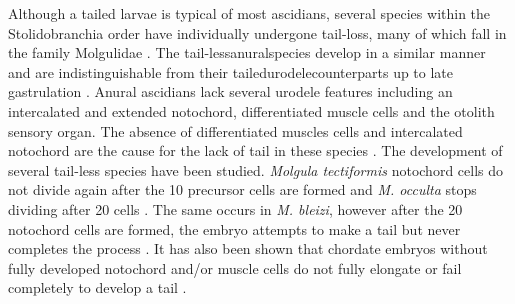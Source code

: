 Although a tailed larvae is typical of most ascidians, several species within the Stolidobranchia order have individually undergone tail-loss, many of which fall in the family Molgulidae \cite{berrill_studies_1931, jeffery_evolution_1999, huber_evolution_2000, maliska_molgula_2010}. The tail-less\textemdash anural\textemdash species develop in a similar manner and are indistinguishable from their tailed\textemdash urodele\textemdash counterparts up to late gastrulation \cite{berrill_studies_1931, swalla_interspecific_1990, jeffery_factors_1992}. Anural ascidians lack several urodele features including an intercalated and extended notochord, differentiated muscle cells and the otolith sensory organ. The absence of differentiated muscles cells and intercalated notochord are the cause for the lack of tail in these species \cite{miyamoto_formation_1985, swalla_interspecific_1990}. The development of several tail-less species have been studied. \textit{Molgula tectiformis} notochord cells do not divide again after the 10 precursor cells are formed and \textit{M. occulta} stops dividing after 20 cells \cite{jeffery_evolution_1999}. The same occurs in \textit{M. bleizi}, however after the 20 notochord cells are formed, the embryo attempts to make a tail but never completes the process \cite{swalla_novel_1993}. It has also been shown that chordate embryos without fully developed notochord and/or muscle cells do not fully elongate or fail completely to develop a tail \cite{jeffery_evolution_1999,takada_brachyury_2002,stemple_structure_2005}. 
